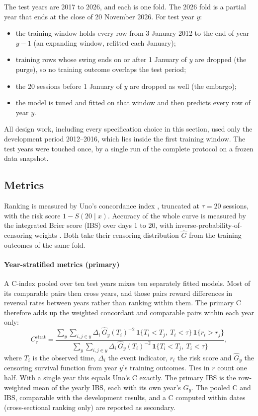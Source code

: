 The test years are 2017 to 2026, and each is one fold. The 2026 fold is a partial year that ends at the close
of 20 November 2026. For test year $y$:

\begin{itemize}
\item the training window holds every row from 3 January 2012 to the end of year $y-1$ (an expanding
  window, refitted each January);
\item training rows whose swing ends on or after 1 January of $y$ are dropped (the purge), so no
  training outcome overlaps the test period;
\item the 20 sessions before 1 January of $y$ are dropped as well (the embargo);
\item the model is tuned and fitted on that window and then predicts every row of year $y$.
\end{itemize}

All design work, including every specification choice in this section, used only the
development period 2012--2016, which lies inside the first training window. The test years were
touched once, by a single run of the complete protocol on a frozen data snapshot.

\subsection{Metrics}\label{sec:metrics}

Ranking is measured by Uno's concordance index \citep{Uno2011}, truncated at $\tau=20$ sessions,
with the risk score $1-S(20\mid x)$. Accuracy of the whole curve is measured by the integrated Brier
score (IBS) over days 1 to 20, with inverse-probability-of-censoring weights \citep{Graf1999}. Both
take their censoring distribution $\hat G$ from the training outcomes of the same fold.

\paragraph{Year-stratified metrics (primary)} A C-index pooled over ten test years mixes ten
separately fitted models. Most of its comparable pairs then cross years, and those pairs
reward differences in reversal rates between years rather than ranking within them. The primary C
therefore adds up the weighted concordant and comparable pairs within each year only:
\begin{equation}\label{eq:stratc}
  C^{\mathrm{strat}}_\tau = \frac{\sum_y \sum_{i,j\in y} \Delta_i\,\hat G_y(T_i)^{-2}\,
    \mathbf{1}\{T_i<T_j,\ T_i<\tau\}\,\mathbf{1}\{r_i>r_j\}}
  {\sum_y \sum_{i,j\in y} \Delta_i\,\hat G_y(T_i)^{-2}\,\mathbf{1}\{T_i<T_j,\ T_i<\tau\}},
\end{equation}
where $T_i$ is the observed time, $\Delta_i$ the event indicator, $r_i$ the risk score and $\hat
G_y$ the censoring survival function from year $y$'s training outcomes. Ties in $r$ count one half.
With a single year this equals Uno's C exactly. The primary IBS is the row-weighted mean of the
yearly IBS, each with its own year's $\hat G_y$. The pooled C and IBS, comparable with the
development results, and a C computed within dates (cross-sectional ranking only) are reported as
secondary.

